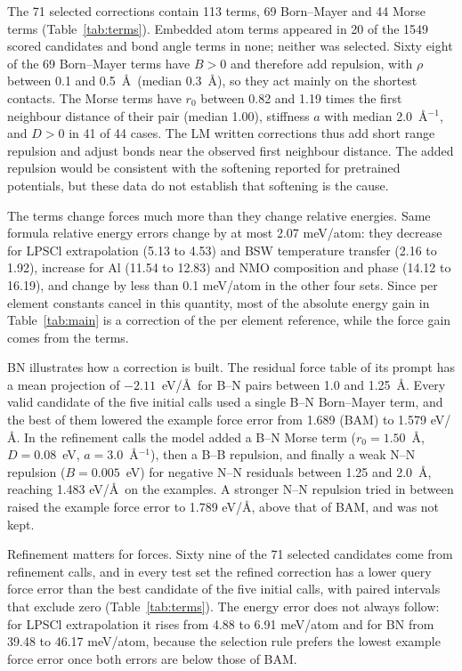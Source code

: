The 71 selected corrections contain 113 terms, 69 Born--Mayer and 44 Morse terms (Table~\ref{tab:terms}). Embedded atom terms appeared in 20 of the 1549 scored candidates and bond angle terms in none; neither was selected. Sixty eight of the 69 Born--Mayer terms have $B>0$ and therefore add repulsion, with $\rho$ between 0.1 and 0.5~\AA\ (median 0.3~\AA), so they act mainly on the shortest contacts. The Morse terms have $r_0$ between 0.82 and 1.19 times the first neighbour distance of their pair (median 1.00), stiffness $a$ with median 2.0~\AA$^{-1}$, and $D>0$ in 41 of 44 cases. The LM written corrections thus add short range repulsion and adjust bonds near the observed first neighbour distance. The added repulsion would be consistent with the softening reported for pretrained potentials,\cite{deng2025softening} but these data do not establish that softening is the cause.

The terms change forces much more than they change relative energies. Same formula relative energy errors change by at most 2.07 meV/atom: they decrease for LPSCl extrapolation (5.13 to 4.53) and BSW temperature transfer (2.16 to 1.92), increase for Al (11.54 to 12.83) and NMO composition and phase (14.12 to 16.19), and change by less than 0.1 meV/atom in the other four sets. Since per element constants cancel in this quantity, most of the absolute energy gain in Table~\ref{tab:main} is a correction of the per element reference, while the force gain comes from the terms.

BN illustrates how a correction is built. The residual force table of its prompt has a mean projection of $-2.11$~eV/\AA\ for B--N pairs between 1.0 and 1.25~\AA. Every valid candidate of the five initial calls used a single B--N Born--Mayer term, and the best of them lowered the example force error from 1.689 (BAM) to 1.579 eV/\AA. In the refinement calls the model added a B--N Morse term ($r_0=1.50$~\AA, $D=0.08$~eV, $a=3.0$~\AA$^{-1}$), then a B--B repulsion, and finally a weak N--N repulsion ($B=0.005$~eV) for negative N--N residuals between 1.25 and 2.0~\AA, reaching 1.483 eV/\AA\ on the examples. A stronger N--N repulsion tried in between raised the example force error to 1.789 eV/\AA, above that of BAM, and was not kept.

Refinement matters for forces. Sixty nine of the 71 selected candidates come from refinement calls, and in every test set the refined correction has a lower query force error than the best candidate of the five initial calls, with paired intervals that exclude zero (Table~\ref{tab:terms}). The energy error does not always follow: for LPSCl extrapolation it rises from 4.88 to 6.91 meV/atom and for BN from 39.48 to 46.17 meV/atom, because the selection rule prefers the lowest example force error once both errors are below those of BAM.

